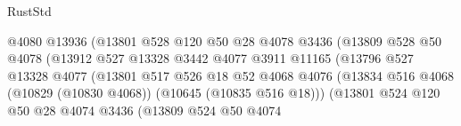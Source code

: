 \begin{lexlean}{RustStd}
\begin{coremodule}
                                          @4080
                                          @13936
                                          (@13801
                                            @528
                                            @120
                                            @50
                                            @28
                                            @4078
                                            @3436
                                            (@13809
                                              @528
                                              @50
                                              @4078
                                              (@13912
                                                @527
                                                @13328
                                                @3442
                                                @4077
                                                @3911
                                                @11165
                                                (@13796
                                                  @527
                                                  @13328
                                                  @4077
                                                  (@13801
                                                    @517
                                                    @526
                                                    @18
                                                    @52
                                                    @4068
                                                    @4076
                                                    (@13834
                                                      @516
                                                      @4068
                                                      (@10829 (@10830 @4068))
                                                      (@10645 (@10835 @516 @18)))
                                                    (@13801
                                                      @524
                                                      @120
                                                      @50
                                                      @28
                                                      @4074
                                                      @3436
                                                      (@13809
                                                        @524
                                                        @50
                                                        @4074

\end{coremodule}
\end{lexlean}

